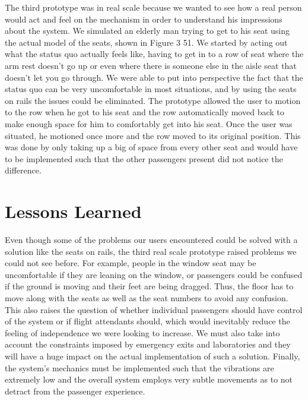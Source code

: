 \documentclass[a4paper, 12pt,conference]{new_cit_thesis}
\begin{document}
The third prototype was in real scale because we wanted to see how a real person would act and feel on the mechanism in order to understand his impressions about the system. We simulated an elderly man trying to get to his seat using the actual model of the seats, shown in Figure 3 51. We started by acting out what the status quo actually feels like, having to get in to a row of seat where the arm rest doesn’t go up or even where there is someone else in the aisle seat that doesn’t let you go through. We were able to put into perspective the fact that the status quo can be very uncomfortable in most situations, and by using the seats on rails the issues could be eliminated. The prototype allowed the user to motion to the row when he got to his seat and the row automatically moved back to make enough space for him to comfortably get into his seat. Once the user was situated, he motioned once more and the row moved to its original position. This was done by only taking up a big of space from every other seat and would have to be implemented such that the other passengers present did not notice the difference.

\section*{Lessons Learned}
Even though some of the problems our users encountered could be solved with a solution like the seats on rails, the third real scale prototype raised problems we could not see before.  For example, people in the window seat may be uncomfortable if they are leaning on the window, or passengers could be confused if the ground is moving and their feet are being dragged. Thus, the floor has to move along with the seats as well as the seat numbers to avoid any confusion. This also raises the question of whether individual passengers should have control of the system or if flight attendants should, which would inevitably reduce the feeling of independence we were looking to increase. We must also take into account the constraints imposed by emergency exits and laboratories and they will have a huge impact on the actual implementation of such a solution. Finally, the system’s mechanics must be implemented such that the vibrations are extremely low and the overall system employs very subtle movements as to not detract from the passenger experience. 
\end{document}
